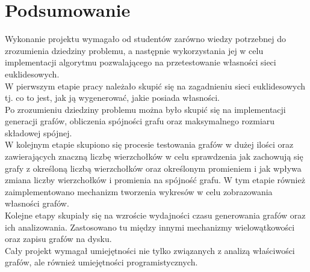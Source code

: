 
\chapter{Podsumowanie}
	\label{podsumowanie}

	Wykonanie projektu wymagało od studentów zarówno wiedzy potrzebnej do zrozumienia dziedziny problemu, a następnie wykorzystania jej w celu implementacji algorytmu pozwalającego na przetestowanie własności sieci euklidesowych.\\
	W pierwszym etapie pracy należało skupić się na zagadnieniu sieci euklidesowych tj. co to jest, jak ją wygenerować, jakie posiada własności.\\
	Po zrozumieniu dziedziny problemu można było skupić się na implementacji generacji grafów, obliczenia spójności grafu oraz maksymalnego rozmiaru składowej spójnej.\\
	W kolejnym etapie skupiono się procesie testowania grafów w dużej ilości oraz zawierających znaczną liczbę wierzchołków w celu sprawdzenia jak zachowują się grafy z określoną liczbą wierzchołków oraz określonym promieniem i jak wpływa zmiana liczby wierzchołków i promienia na spójność grafu. W tym etapie również zaimplementowano mechanizm tworzenia wykresów w celu zobrazowania własności grafów.\\
	Kolejne etapy skupiały się na wzroście wydajności czasu generowania grafów oraz ich analizowania. Zastosowano tu między innymi mechanizmy wielowątkowości oraz zapisu grafów na dysku.\\
	Cały projekt wymagał umiejętności nie tylko związanych z analizą właściwości grafów, ale również umiejętności programistycznych.
